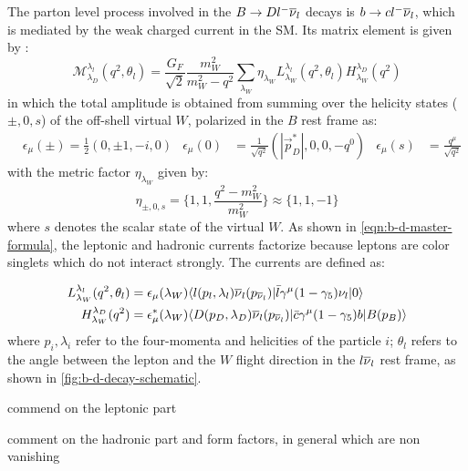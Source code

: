 The parton level process involved in the $B \rightarrow D {l^-}{{\overline{\nu}}_l}$ decays is
$b \rightarrow c {l^-}{{\overline{\nu}}_l}$,
which is mediated by the weak charged current in the SM.
Its matrix element is given by \cite{Tanaka_1995}:
\begin{equation}
    \mathcal{M}^{\lambda_l}_{\lambda_D}(q^2, \theta_l) =
    \frac{G_F}{\sqrt{2}} \frac{m^2_W}{m^2_W - q^2}
    \sum_{\lambda_W} \eta_{\lambda_W}
    L^{\lambda_l}_{\lambda_W}(q^2, \theta_l)
    H^{\lambda_D}_{\lambda_W}(q^2)
    \label{eqn:b-d-master-formula}
\end{equation}
in which the total amplitude is obtained from summing over the helicity states
($\pm,0,s$)
of the off-shell virtual $W$,
polarized in the $B$ rest frame as:
\begin{align}
    & \epsilon_\mu(\pm) = \frac{1}{2}(0, \pm1, -i, 0)
    & \epsilon_\mu(0) &= \frac{1}{\sqrt{q^2}}(|\vec{p}^*_D|, 0, 0, -q^0)
    & \epsilon_\mu(s) &= \frac{q^\mu}{\sqrt{q^2}}
\end{align}
with the metric factor $\eta_{\lambda_W}$ given by:
\begin{equation}
    \eta_{\pm,0,s} = \{1, 1, \frac{q^2 - m_W^2}{m_W^2}\} \approx \{1, 1, -1\}
\end{equation}
where $s$ denotes the scalar state of the virtual $W$.
As shown in \cref{eqn:b-d-master-formula},
the leptonic and hadronic currents factorize because leptons
are color singlets which do not interact strongly.
The currents are defined as:

\begin{align}
    L^{\lambda_l}_{\lambda_W}(q^2, \theta_l)
    & =
    \epsilon_\mu(\lambda_W)
    \langle l(p_l, \lambda_l) {{\overline{\nu}}_l}(p_{{\overline{\nu}}_l})\rvert \bar{l} \gamma^\mu (1 - \gamma_5) {{\nu}_l}
    \lvert0\rangle \\
    H^{\lambda_D}_{\lambda_W}(q^2)
    & =
    \epsilon^*_\mu(\lambda_W)
    \langle D(p_D, \lambda_D) {{\overline{\nu}}_l}(p_{{\overline{\nu}}_l})\rvert \bar{c} \gamma^\mu (1 - \gamma_5) b
    \lvert B(p_B)\rangle
\end{align}
where $p_i, \lambda_i$ refer to the four-momenta and helicities of the particle
$i$;
$\theta_l$ refers to the angle between the lepton and the $W$ flight direction
in the $l{{\overline{\nu}}_l}$ rest frame,
as shown in \cref{fig:b-d-decay-schematic}.



commend on the leptonic part

comment on the hadronic part and form factors,
in general which are non vanishing



